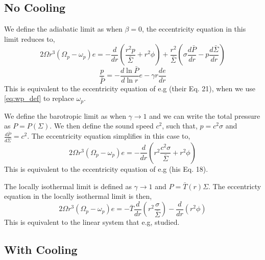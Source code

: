 \documentclass[apj]{emulateapj}
\begin{document}
\subsection{No Cooling} 

We define the  adiabatic limit as when $\beta=0$, the eccentricity equation in this limit reduces to,
\begin{equation}
2 \Omega r^3 ( \Omega_p - \omega_p) e = - \frac{d}{dr} \left( \frac{r^2 p}{\bar{\Sigma}} + r^2 \phi \right) + \frac{r^2}{\bar{\Sigma}} \left( \sigma \frac{d \bar{P}}{dr} - p \frac{d \bar{\Sigma}}{d r} \right) 
\end{equation}
\begin{equation}
\frac{p}{\bar{P}} = - \frac{ d\ln \bar{P}}{d \ln r } e - \gamma r \frac{ d e}{d r}
\end{equation}
This is equivalent to the eccentricity equation of e.g \citet{go06} (their Eq. 21), when we use \eqref{eq:wp_def} to replace $\omega_p$. 

We define the barotropic limit as when $\gamma \rightarrow 1$ and we can write the total pressure as $P = P(\Sigma)$. We then define the sound speed $c^2$, such that, $p = c^2 \sigma$ and $\frac{d \bar{P}}{d \bar{\Sigma}} = c^2 $. The eccentricity equation simplifies in this case to,
\begin{equation}
2 \Omega r^3 ( \Omega_p - \omega_p) e = - \frac{d}{dr} \left( r^2 \frac{c^2 \sigma}{\bar{\Sigma}} + r^2 \phi \right) 
\end{equation}
This is equivalent to the eccentricity equation of e.g \citet{papa02} (his Eq. 18).

The locally isothermal limit is defined as $\gamma \rightarrow 1$ and $P = \bar{T}(r) \Sigma$. The eccentricty equation in the locally isothermal limit is then,
\begin{equation}
2 \Omega r^3 ( \Omega_p - \omega_p) e = - \bar{T} \frac{d}{dr} \left( r^2 \frac{\sigma}{\bar{\Sigma}} \right) - \frac{d}{dr} \left( r^2 \phi \right) 
\end{equation}
This is equivalent to the linear system that e.g, \citet{lin15} studied. 
 
\subsection{With Cooling}
\end{document}
